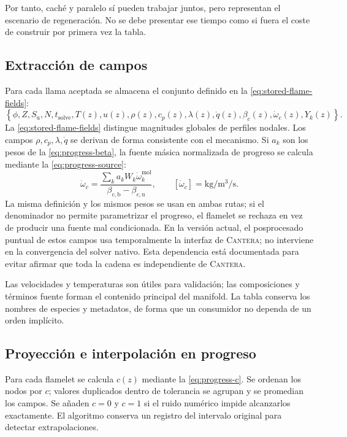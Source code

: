 \documentclass[12pt,a4paper,twoside,openany]{book}
\newcommand{\Su}{S_{\mathrm{u}}}
\newcommand{\Cantera}{\textsc{Cantera}\xspace}
\begin{document}
Por tanto, caché y paralelo sí pueden trabajar juntos, pero representan el
escenario de regeneración. No se debe presentar ese tiempo como si fuera el coste
de construir por primera vez la tabla.

\subsection{Extracción de campos}

Para cada llama aceptada se almacena el conjunto definido en la \cref{eq:stored-flame-fields}:
\begin{equation}
  \left\{
  \phi,Z,\Su,N,t_{\mathrm{solve}},T(z),u(z),\rho(z),c_p(z),
  \lambda(z),\dot q(z),\beta_c(z),\dot\omega_c(z),Y_k(z)
  \right\}.
  \label{eq:stored-flame-fields}
\end{equation}
La \cref{eq:stored-flame-fields} distingue magnitudes globales de perfiles
nodales. Los campos \(\rho,c_p,\lambda,\dot q\) se derivan de forma consistente
con el mecanismo. Si \(a_k\) son los pesos de la \cref{eq:progress-beta}, la fuente
másica normalizada de progreso se calcula mediante la \cref{eq:progress-source}:
\begin{equation}
  \dot\omega_c=
  \frac{\displaystyle\sum_k a_kW_k\dot\omega_k^{\mathrm{mol}}}
  {\beta_{c,\mathrm b}-\beta_{c,\mathrm u}},
  \qquad [\dot\omega_c]=\si{\kilogram\per\cubic\metre\per\second}.
  \label{eq:progress-source}
\end{equation}
La misma definición y los mismos pesos se usan en ambas rutas; si el denominador
no permite parametrizar el progreso, el flamelet se rechaza en vez de producir
una fuente mal condicionada.
En la versión actual, el posprocesado puntual de estos campos usa temporalmente
la interfaz de \Cantera; no interviene en la convergencia del solver nativo. Esta
dependencia está documentada para evitar afirmar que toda la cadena es
independiente de \Cantera.

Las velocidades y temperaturas son útiles para validación; las composiciones y
términos fuente forman el contenido principal del manifold. La tabla conserva
los nombres de especies y metadatos, de forma que un consumidor no dependa de un
orden implícito.

\subsection{Proyección e interpolación en progreso}

Para cada flamelet se calcula \(c(z)\) mediante la \cref{eq:progress-c}. Se ordenan
los nodos por \(c\); valores duplicados dentro de tolerancia se agrupan y se
promedian los campos. Se añaden \(c=0\) y \(c=1\) si el ruido numérico impide
alcanzarlos exactamente. El algoritmo conserva un registro del intervalo
original para detectar extrapolaciones.
\end{document}
